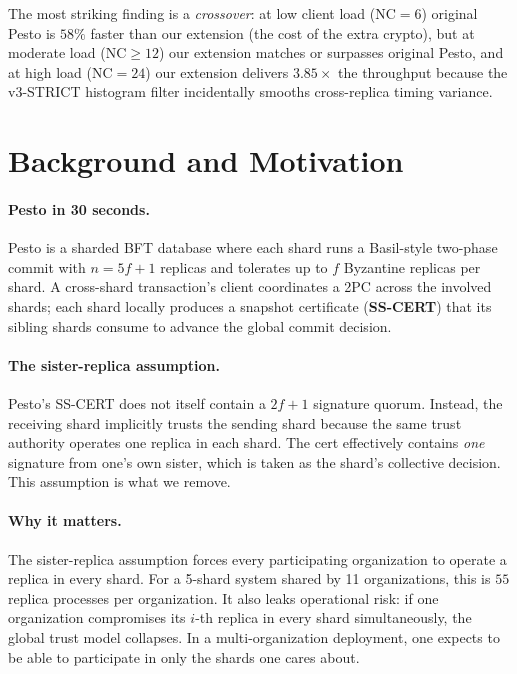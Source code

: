 \documentclass[letterpaper,twocolumn,10pt]{article}
\begin{document}
The most striking finding is a \emph{crossover}: at low client load
($\mathrm{NC}=6$) original Pesto is $58\%$ faster than our extension
(the cost of the extra crypto), but at moderate load
($\mathrm{NC}\geq 12$) our extension matches or surpasses original
Pesto, and at high load ($\mathrm{NC}=24$) our extension delivers
$3.85\times$ the throughput because the v3-STRICT histogram filter
incidentally smooths cross-replica timing variance.


\section{Background and Motivation}

\paragraph{Pesto in 30 seconds.} Pesto is a sharded BFT database where
each shard runs a Basil-style two-phase commit with $n=5f+1$ replicas
and tolerates up to $f$ Byzantine replicas per shard. A cross-shard
transaction's client coordinates a 2PC across the involved shards; each
shard locally produces a snapshot certificate (\textbf{SS-CERT}) that
its sibling shards consume to advance the global commit decision.

\paragraph{The sister-replica assumption.} Pesto's SS-CERT does not
itself contain a $2f{+}1$ signature quorum. Instead, the receiving
shard implicitly trusts the sending shard because the same trust
authority operates one replica in each shard. The cert effectively
contains \emph{one} signature from one's own sister, which is taken as
the shard's collective decision. This assumption is what we remove.

\paragraph{Why it matters.} The sister-replica assumption forces
every participating organization to operate a replica in every shard.
For a 5-shard system shared by 11 organizations, this is $55$ replica
processes per organization. It also leaks operational risk: if one
organization compromises its $i$-th replica in every shard
simultaneously, the global trust model collapses. In a
multi-organization deployment, one expects to be able to participate
in only the shards one cares about.
\end{document}
